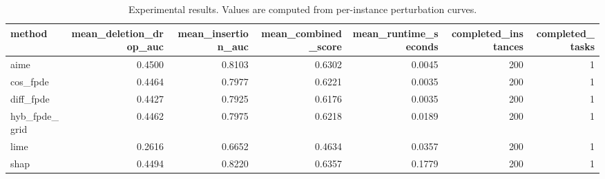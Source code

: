 \begin{table}[t]
\caption{Experimental results. Values are computed from per-instance perturbation curves.}
\label{tab:main_results_computed}
\centering
\begin{tabular}{lrrrrrr}
\toprule
method & mean\_deletion\_drop\_auc & mean\_insertion\_auc & mean\_combined\_score & mean\_runtime\_seconds & completed\_instances & completed\_tasks \\
\midrule
aime & 0.4500 & 0.8103 & 0.6302 & 0.0045 & 200 & 1 \\
cos\_fpde & 0.4464 & 0.7977 & 0.6221 & 0.0035 & 200 & 1 \\
diff\_fpde & 0.4427 & 0.7925 & 0.6176 & 0.0035 & 200 & 1 \\
hyb\_fpde\_grid & 0.4462 & 0.7975 & 0.6218 & 0.0189 & 200 & 1 \\
lime & 0.2616 & 0.6652 & 0.4634 & 0.0357 & 200 & 1 \\
shap & 0.4494 & 0.8220 & 0.6357 & 0.1779 & 200 & 1 \\
\bottomrule
\end{tabular}

\end{table}
